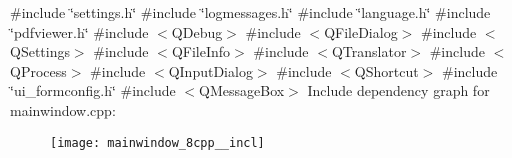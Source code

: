 {\ttfamily \#include \char`\"{}settings.\+h\char`\"{}}\newline
{\ttfamily \#include \char`\"{}logmessages.\+h\char`\"{}}\newline
{\ttfamily \#include \char`\"{}language.\+h\char`\"{}}\newline
{\ttfamily \#include \char`\"{}pdfviewer.\+h\char`\"{}}\newline
{\ttfamily \#include $<$Q\+Debug$>$}\newline
{\ttfamily \#include $<$Q\+File\+Dialog$>$}\newline
{\ttfamily \#include $<$Q\+Settings$>$}\newline
{\ttfamily \#include $<$Q\+File\+Info$>$}\newline
{\ttfamily \#include $<$Q\+Translator$>$}\newline
{\ttfamily \#include $<$Q\+Process$>$}\newline
{\ttfamily \#include $<$Q\+Input\+Dialog$>$}\newline
{\ttfamily \#include $<$Q\+Shortcut$>$}\newline
{\ttfamily \#include \char`\"{}ui\+\_\+formconfig.\+h\char`\"{}}\newline
{\ttfamily \#include $<$Q\+Message\+Box$>$}\newline
Include dependency graph for mainwindow.\+cpp\+:\nopagebreak
\begin{figure}[H]
\begin{center}
\leavevmode
\texttt{[image: mainwindow\_8cpp\_\_incl]}
\end{center}
\end{figure}
